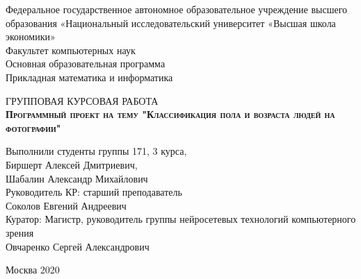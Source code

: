 \begin{titlepage}
    \newpage

    {
    \begin{center}
        Федеральное государственное автономное образовательное учреждение высшего образования «Национальный исследовательский университет «Высшая школа экономики»
        \\
        \bigskip
        Факультет компьютерных наук \\
        Основная образовательная программа \\
        Прикладная математика и информатика \\
    \end{center}
    }

    \vspace{8em}

    \begin{center}
    {\Large ГРУППОВАЯ КУРСОВАЯ РАБОТА}
        \\
        \textsc{\textbf{
            Программный проект на тему
            \linebreak
            "Классификация пола и возраста людей на фотографии"}}
    \end{center}

    \vspace{2em}

    {
    \hfill\parbox{16cm}{
        \hspace*{5cm}\hspace*{-5cm}Выполнили студенты группы 171, 3 курса,\\
        Биршерт Алексей Дмитриевич,\\
        Шабалин Александр Михайлович \\

        \hspace*{5cm}\hspace*{-5cm}Руководитель КР: старший преподаватель\\
        Соколов Евгений Андреевич
        \\


        \hspace*{5cm}\hspace*{-5cm}Куратор: Магистр, руководитель группы нейросетевых технологий компьютерного зрения \\
        Овчаренко Сергей Александрович
        \\
    }
    }

    \vspace{\fill}

    \begin{center}
        Москва 2020
    \end{center}

\end{titlepage}